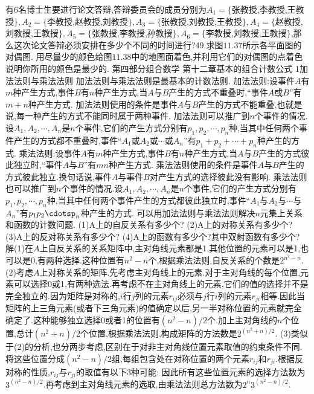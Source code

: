 有6名博士生要进行论文答辩,答辩委员会的成员分别为$A_{1}=\{$张教授,李教授,王教授$\},A_{2}=\{$李教授,赵教授,刘教授$\},A_{3}=\{$张教授,刘教授,王教授$\},A_{4}=\{$赵教授,刘教授,王教授$\},A_{5}=\{$张教授,李教授,孙教授$\},A_{6}=\{$李教授,刘教授,王教授$\}$,那么这次论文答辩必须安排在多少个不同的时间进行?49.求图$11.37$所示各平面图的对偶图.
用尽量少的颜色给图$11.38$中的地图面着色,并利用它们的对偶图的点着色说明你所用的颜色是最少的.
{第四部分组合数学}
{第十二章基本的组合计数公式}
{1加法法则与乘法法则}
加法法则与乘法法则是最基本的计数法则.
加法法则:设事件$A$有$m$种产生方式,事件$B$有$n$种产生方式,当$A$与$B$产生的方式不重叠时,“事件$A$或$B$”有$m+n$种产生方式.
加法法则使用的条件是事件$A$与$B$产生的方式不能重叠.也就是说,每一种产生的方式不能同时属于两种事件.
加法法则可以推广到$n$个事件的情况.设$A_{1},A_{2},\cdots,A_{n}$是$n$个事件,它们的产生方式分别有$p_{1},p_{2},\cdots,p_{n}$种,当其中任何两个事件产生的方式都不重叠时,事件“$A_{1}$或$A_{2}$或$\cdots$或$A_{n}$”有$p_{1}+$$p_{2}+\cdots+p_{n}$种产生的方式.
乘法法则:设事件$A$有$m$种产生方式,事件$B$有$n$种产生方式,当$A$与$B$产生的方式彼此独立时,“事件$A$与$B$”有$mn$种产生方式.
乘法法则使用的条件是事件$A$与$B$产生的方式彼此独立.换句话说,事件$A$与事件$B$对产生方式的选择彼此没有影响.
乘法法则也可以推广到$n$个事件的情况.设$A_{1},A_{2},\cdots,A_{n}$是$n$个事件,它们的产生方式分别有$p_{1},p_{2},\cdots,p_{n}$种,当其中任何两个事件产生的方式都彼此独立时,事件“$A_{1}$与$A_{2}$与$\cdots$与$A_{n}$”有$p_{1}p_{2}\cdotsp_{n}$种产生的方式.
可以用加法法则与乘法法则解决$n$元集上关系和函数的计数问题.
(1)A上的自反关系有多少个?
(2)A上的对称关系有多少个?
(3)A上的反对称关系有多少个?
(4)A上的函数有多少个?其中双射函数有多少个?
解(1)在$A$上自反关系的关系矩阵中,主对角线元素都是1,其他位置的元素可以是1,也可以是0,有两种选择.这种位置有$n^{2}-n$个,根据乘法法则,自反关系的个数是$2^{n^{2}-n}$.
(2)考虑$A$上对称关系的矩阵.先考虑主对角线上的元素.对于主对角线的每个位置,元素可以选择0或1,有两种选法.再考虑不在主对角线上的元素,它们的值的选择并不是完全独立的.因为矩阵是对称的,$i$行$j$列的元素$r_{ij}$必须与$j$行$i$列的元素$r_{ji}$相等.因此当矩阵的上三角元素(或者下三角元素)的值确定以后,另一半对称位置的元素就完全确定了.这种能够独立选择0或者1的位置有$\left(n^{2}-n\right)/2$个.加上主对角线的$n$个位置,总计$\left(n^{2}+n\right)/2$个位置,根据乘法法则,构成矩阵的方法数是$2^{\left(n^{2}+n\right)/2}$.
(3)类似于(2)的分析,也分两步考虑,区别在于对非主对角线位置元素取值的约束条件不同.将这些位置分成$\left(n^{2}-n\right)/2$组,每组包含处在对称位置的两个元素$r_{ij}$和$r_{ji}$.根据反对称的性质,$r_{ij}$与$r_{ji}$的取值有以下3种可能:
因此所有这些位置元素的选择方法数为$3^{\left(n^{2}-n\right)/2}$.再考虑到主对角线元素的选取,由乘法法则总方法数为$2^{n}3^{\left(n^{2}-n\right)/2}$.
$$
